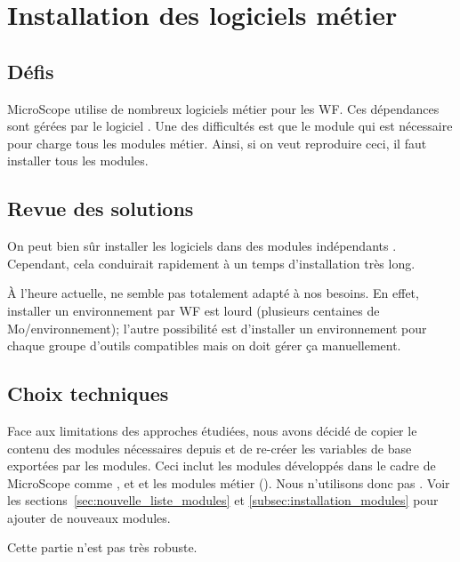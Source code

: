 \section{Installation des logiciels métier} \label{sec:installation_logiciels_metier}

\subsection{Défis}

MicroScope utilise de nombreux logiciels métier pour les WF.
Ces dépendances sont gérées par le logiciel .
Une des difficultés est que le module  qui est nécessaire pour 
charge tous les modules métier.
Ainsi, si on veut reproduire ceci, il faut installer tous les modules.

\subsection{Revue des solutions}

On peut bien sûr installer les logiciels dans des modules indépendants .
Cependant, cela conduirait rapidement à un temps d'installation très long.

À l'heure actuelle,  ne semble pas totalement adapté à nos besoins.
En effet, installer un environnement par WF est lourd (plusieurs centaines de Mo/environnement);
l'autre possibilité est d'installer un environnement pour chaque groupe d'outils compatibles mais on doit gérer ça manuellement.

\subsection{Choix techniques}

Face aux limitations des approches étudiées, nous avons décidé de copier le contenu des modules nécessaires depuis 
et de re-créer les variables de base exportées par les modules.
Ceci inclut les modules développés dans le cadre de MicroScope comme ,  et 
et les modules métier ().
Nous n'utilisons donc pas .
Voir les sections~\ref{sec:nouvelle_liste_modules} et \ref{subsec:installation_modules} pour ajouter de nouveaux modules.

\begin{warningbox}
    Cette partie n'est pas très robuste.
\end{warningbox}
